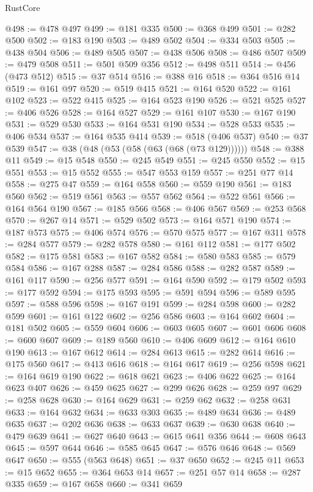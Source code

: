 \begin{lexlean}{RustCore}
\begin{coremodule}
@498 := @478 @497
@499 := @181 @335
@500 := @368 @499
@501 := @282 @500
@502 := @183 @190
@503 := @489 @502
@504 := @334 @503
@505 := @438 @504
@506 := @489 @505
@507 := @438 @506
@508 := @486 @507
@509 := @479 @508
@511 := @501 @509 @356
@512 := @498 @511
@514 := @456 (@473 @512)
@515 := @37 @514
@516 := @388 @16
@518 := @364 @516 @14
@519 := @161 @97
@520 := @519 @415
@521 := @164 @520
@522 := @161 @102
@523 := @522 @415
@525 := @164 @523 @190
@526 := @521 @525
@527 := @406 @526
@528 := @164 @527
@529 := @161 @107
@530 := @167 @190
@531 := @529 @530
@533 := @164 @531 @190
@534 := @528 @533
@535 := @406 @534
@537 := @164 @535 @414
@539 := @518 (@406 @537)
@540 := @37 @539
@547 := @38 (@48 (@53 (@58 (@63 (@68 (@73 @129))))))
@548 := @388 @11
@549 := @15 @548
@550 := @245 @549
@551 := @245 @550
@552 := @15 @551
@553 := @15 @552
@555 := @547 @553 @159
@557 := @251 @77 @14
@558 := @275 @47
@559 := @164 @558
@560 := @559 @190
@561 := @183 @560
@562 := @519 @561
@563 := @557 @562
@564 := @522 @561
@566 := @164 @564 @190
@567 := @185 @566
@568 := @406 @567
@569 := @253 @568
@570 := @267 @14
@571 := @529 @502
@573 := @164 @571 @190
@574 := @187 @573
@575 := @406 @574
@576 := @570 @575
@577 := @167 @311
@578 := @284 @577
@579 := @282 @578
@580 := @161 @112
@581 := @177 @502
@582 := @175 @581
@583 := @167 @582
@584 := @580 @583
@585 := @579 @584
@586 := @167 @288
@587 := @284 @586
@588 := @282 @587
@589 := @161 @117
@590 := @256 @577
@591 := @164 @590
@592 := @179 @502
@593 := @177 @592
@594 := @175 @593
@595 := @591 @594
@596 := @589 @595
@597 := @588 @596
@598 := @167 @191
@599 := @284 @598
@600 := @282 @599
@601 := @161 @122
@602 := @256 @586
@603 := @164 @602
@604 := @181 @502
@605 := @559 @604
@606 := @603 @605
@607 := @601 @606
@608 := @600 @607
@609 := @189 @560
@610 := @406 @609
@612 := @164 @610 @190
@613 := @167 @612
@614 := @284 @613
@615 := @282 @614
@616 := @175 @560
@617 := @413 @616
@618 := @164 @617
@619 := @256 @598
@621 := @164 @619 @190
@622 := @618 @621
@623 := @406 @622
@625 := @164 @623 @407
@626 := @459 @625
@627 := @299 @626
@628 := @259 @97
@629 := @258 @628
@630 := @164 @629
@631 := @259 @62
@632 := @258 @631
@633 := @164 @632
@634 := @633 @303
@635 := @489 @634
@636 := @489 @635
@637 := @202 @636
@638 := @633 @637
@639 := @630 @638
@640 := @479 @639
@641 := @627 @640
@643 := @615 @641 @356
@644 := @608 @643
@645 := @597 @644
@646 := @585 @645
@647 := @576 @646
@648 := @569 @647
@650 := @555 (@563 @648)
@651 := @37 @650
@652 := @245 @11
@653 := @15 @652
@655 := @364 @653 @14
@657 := @251 @57 @14
@658 := @287 @335
@659 := @167 @658
@660 := @341 @659

\end{coremodule}
\end{lexlean}

